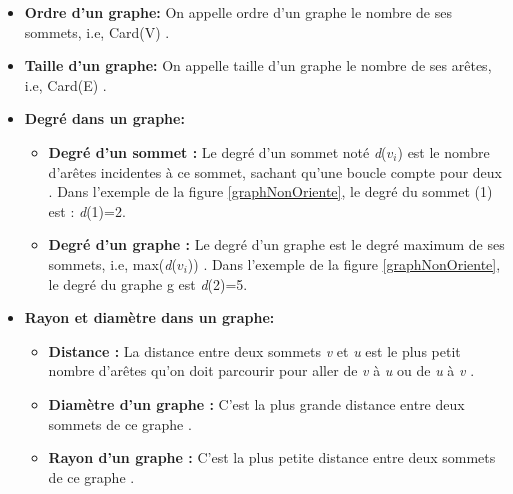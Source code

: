 		\begin{itemize}[label=$\circ$]
			
			\item \textbf{Ordre d'un graphe:} On appelle ordre d’un 					graphe le nombre de ses sommets, i.e, Card(V) \citep{DUT}.
			
			\item  \textbf{Taille d'un graphe:} On appelle taille d’un 				graphe le nombre de ses arêtes, i.e, Card(E) \citep{DUT}.
			
			\item  \textbf{Degré dans un graphe:}
			
			
			\begin{itemize}[label=$\bullet$]
				\item \textbf{Degré d'un sommet : } Le degré d’un sommet noté \textit{d}($\textit{v}_{i}$) est le nombre d'arêtes incidentes à ce sommet, sachant qu’une boucle compte pour deux \citep{muller}. Dans l'exemple de la figure \ref{graphNonOriente}, le degré du sommet (1) est : \textit{d}(1)=2.
				
				\item \textbf{Degré d'un graphe : }Le degré d’un graphe est le degré maximum de ses sommets, i.e, max(\textit{d}($\textit{v}_{i}$)) \citep{muller}. Dans l’exemple de 				la figure \ref{graphNonOriente}, le degré du graphe g est \textit{d}(2)=5.
			\end{itemize}
			
			\item \textbf{Rayon et diamètre dans un graphe:}
			\begin{itemize}[label=$\bullet$]
				\item \textbf{Distance : }La distance entre deux sommets 	\textit{v} et \textit{u} est le plus petit nombre d’arêtes qu’on doit parcourir pour aller de \textit{v} à \textit{u} ou de \textit{u} à \textit{v} \citep{muller}. 
				
				\item 	\textbf{Diamètre d’un graphe :} C’est la plus grande 	distance entre deux sommets de ce graphe \citep{muller}. 
				
				\item 	\textbf{Rayon d’un graphe : }C’est la plus petite distance entre deux sommets de ce graphe \citep{parlebas1972centralite}. 
			\end{itemize}
		\end{itemize}
		
	
			
	